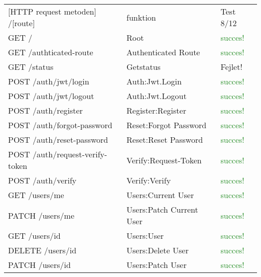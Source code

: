\documentclass{report}
\begin{document}
\begin{table}[H]
\centering
{}
\begin{tabularx}{\textwidth}{X X X}

[HTTP request metoden] /[route]
&
funktion
&
Test 8/12
\\


GET	/
&
Root
&
\textcolor{ForestGreen}{succes!}
\\


GET	/authticated-route
&
Authenticated Route
&
\textcolor{ForestGreen}{succes!}
\\

GET /status
&
Getstatus
&
\textcolor{Bittersweet}{Fejlet!}
\\


POST /auth/jwt/login
&
Auth:Jwt.Login
&
\textcolor{ForestGreen}{succes!}
\\

POST /auth/jwt/logout
&
Auth:Jwt.Logout
&
\textcolor{ForestGreen}{succes!}
\\

POST /auth/register
&
Register:Register
&
\textcolor{ForestGreen}{succes!}
\\

POST /auth/forgot-password
&
Reset:Forgot Password
&
\textcolor{ForestGreen}{succes!}
\\

POST /auth/reset-password
&
Reset:Reset Password
&
\textcolor{ForestGreen}{succes!}
\\

POST /auth/request-verify-token
&
Verify:Request-Token
&
\textcolor{ForestGreen}{succes!}
\\

POST /auth/verify
&
Verify:Verify
&
\textcolor{ForestGreen}{succes!}
\\

GET /users/me
&
Users:Current User
&
\textcolor{ForestGreen}{succes!}
\\

PATCH /users/me
&
Users:Patch Current User
&
\textcolor{ForestGreen}{succes!}
\\

GET /users/{id}
&
Users:User
&
\textcolor{ForestGreen}{succes!}
\\

DELETE /users/{id}
&
Users:Delete User
&
\textcolor{ForestGreen}{succes!}
\\

PATCH /users/{id}
&
Users:Patch User
&
\textcolor{ForestGreen}{succes!}
\\


\end{tabularx}
\end{table}
\end{document}
